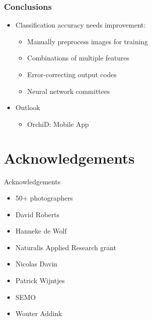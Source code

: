 \documentclass[]{beamer}
\begin{document}
    \begin{frame}
        \frametitle{Conclusions}

        \begin{itemize}
            \item Classification accuracy needs improvement:
            \begin{itemize}
                \item Manually preprocess images for training
                \item Combinations of multiple features
                \item Error-correcting output codes
                \item Neural network committees
            \end{itemize}
        \end{itemize}

        \begin{itemize}
            \item Outlook
            \begin{itemize}
                \item OrchiD: Mobile App
            \end{itemize}
        \end{itemize}
    \end{frame}


\section*{Acknowledgements}

    \begin{frame}{Acknowledgements}
        \begin{itemize}
            \item 50+ photographers
            \item David Roberts
            \item Hanneke de Wolf
            \item Naturalis Applied Research grant
            \item Nicolas Davin
            \item Patrick Wijntjes
            \item SEMO
            \item Wouter Addink
        \end{itemize}
    \end{frame}
\end{document}

